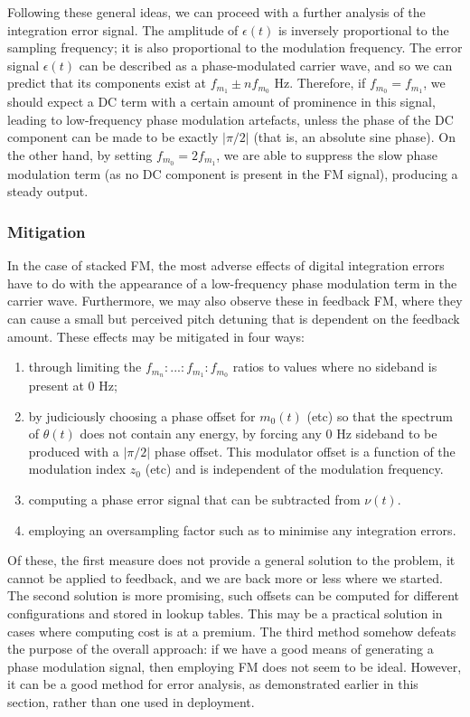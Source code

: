 \documentclass[]{interact}
\begin{document}
Following these general ideas, we can proceed with a further analysis of the integration error signal.
The amplitude of $\epsilon(t)$ is inversely proportional to the sampling frequency; it is also proportional to the modulation frequency. The error signal $\epsilon(t)$ can be described as a phase-modulated carrier wave, and so we can predict that its components exist at $f_{m_1} \pm n f_{m_0}$ Hz. Therefore, if $f_{m_0} = f_{m_1}$, we should expect a DC term with a certain
amount of prominence in this signal, leading to low-frequency phase modulation artefacts, unless the phase of the DC component
can be made to be exactly $|\pi/2|$ (that is, an absolute sine phase). On the other hand, by setting $f_{m_0} = 2f_{m_1}$, we are able to suppress the slow phase modulation term (as no DC component is present in the FM signal), producing a steady output. 

\subsubsection{Mitigation}

In the case of stacked FM, the most adverse effects of digital integration errors have to do with the appearance of a low-frequency phase modulation term in the carrier wave. Furthermore, we may also observe these in feedback FM, where they can cause a small but perceived pitch detuning that is dependent on the feedback amount. These effects may be mitigated in four ways:\\

\begin{enumerate}
\item through limiting the $f_{m_n}: ... : f_{m_1} : f_{m_0}$ ratios to values where no sideband is present at 0 Hz;
\item by judiciously choosing a phase offset for $m_0(t)$ (etc) so that the spectrum of $\theta(t)$ does not
contain any energy, by forcing any 0 Hz sideband to be produced with a $|\pi/2|$ phase offset. This
modulator offset is a function of the modulation index $z_0$ (etc) and is independent of the modulation frequency.
\item computing a phase error signal that can be subtracted from $\nu(t)$.
\item employing an oversampling factor such as to minimise any integration errors.
\end{enumerate}
\bigskip

Of these, the first measure does not provide a general solution to the problem, it cannot be applied to feedback, 
and we are back more or less where we started. The second solution is more promising, such offsets can be computed for different configurations and stored in lookup tables. This may be a practical solution in cases where computing cost is at a premium.
The third method somehow defeats the purpose of the overall approach: if we have a good means of
generating a phase modulation signal, then employing FM does not seem to be ideal. However, it can be a good method
for error analysis, as demonstrated earlier in this section, rather than one used in deployment.
\end{document}
